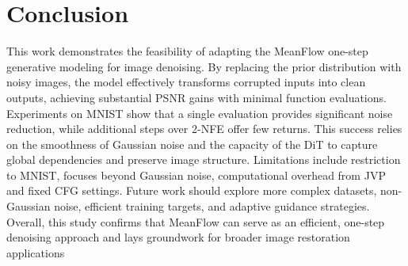 \section{Conclusion}

This work demonstrates the feasibility of adapting the MeanFlow one-step generative modeling for image denoising. By replacing the prior distribution with noisy images, the model effectively transforms corrupted inputs into clean outputs, achieving substantial PSNR gains with minimal function evaluations. Experiments on MNIST show that a single evaluation provides significant noise reduction, while additional steps over 2-NFE offer few returns. This success relies on the smoothness of Gaussian noise and the capacity of the DiT to capture global dependencies and preserve image structure. Limitations include restriction to MNIST, focuses beyond Gaussian noise, computational overhead from JVP and fixed CFG settings. Future work should explore more complex datasets, non-Gaussian noise, efficient training targets, and adaptive guidance strategies. Overall, this study confirms that MeanFlow can serve as an efficient, one-step denoising approach and lays groundwork for broader image restoration applications
